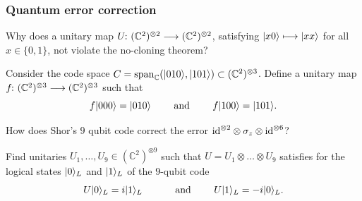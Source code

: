 \documentclass[a4paper, oneside, 12pt]{amsart}
\begin{document}
\subsubsection*{Quantum error correction}
\begin{thmlist}
  \item Why does a unitary map \(U \from ( \mathbb{C}^{2})^{\otimes 2} \to ( \mathbb{C}^{2})^{\otimes 2}\), satisfying \(\lvert x0\rangle \longmapsto \lvert xx\rangle\) for all \(x\in\{0,1\}\), not violate the no-cloning theorem?
  \item Consider the code space \(C = \operatorname{span}_{ \mathbb{C}} (\lvert010\rangle, \lvert101\rangle) \subset ( \mathbb{C}^{2})^{\otimes 3}\).
  Define a unitary map \(f \from ( \mathbb{C}^{2})^{\otimes 3} \to ( \mathbb{C}^{2})^{\otimes 3}\) such that
  \begin{equation*}
    f \lvert000\rangle = \lvert010\rangle \qquad \text{ and }\qquad
    f \lvert100\rangle = \lvert101\rangle.
  \end{equation*}
  \item How does Shor's \(9\) qubit code correct the error \(\mathrm{id}^{\otimes 2} \otimes \sigma_{z}\otimes \mathrm{id}^{\otimes 6}\)?
  \item Find unitaries \(U_{1}, \dots , U_{9} \in ( \mathbb{C}^{2})^{\otimes 9}\) such that \(U = U_{1}\otimes \dots \otimes U_{9}\) satisfies for the logical states \(\lvert0\rangle_{L}\) and \(\lvert1\rangle_{L}\) of the \(9\)-qubit code
  \begin{equation*}
    U \lvert0\rangle_{L} = i\lvert1\rangle_{L} \qquad\quad \text{ and }\qquad
    U \lvert1\rangle_{L} = -i\lvert0\rangle_{L}.
  \end{equation*}
\end{thmlist}


\cleardoublepage

\end{document}
